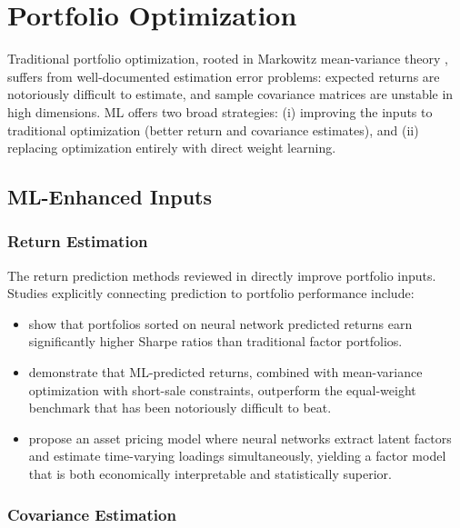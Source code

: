 \section{Portfolio Optimization}\label{sec:portfolio_optimization}

Traditional portfolio optimization, rooted in Markowitz mean-variance theory \citep{Markowitz1952}, suffers from well-documented estimation error problems: expected returns are notoriously difficult to estimate, and sample covariance matrices are unstable in high dimensions. ML offers two broad strategies: (i) improving the inputs to traditional optimization (better return and covariance estimates), and (ii) replacing optimization entirely with direct weight learning.

\subsection{ML-Enhanced Inputs}

\subsubsection{Return Estimation}

The return prediction methods reviewed in  directly improve portfolio inputs. Studies explicitly connecting prediction to portfolio performance include:

\begin{itemize}[leftmargin=*]
    \item \citet{Gu2020} show that portfolios sorted on neural network predicted returns earn significantly higher Sharpe ratios than traditional factor portfolios.
    \item \citet{DeMiguel2020} demonstrate that ML-predicted returns, combined with mean-variance optimization with short-sale constraints, outperform the equal-weight benchmark that has been notoriously difficult to beat.
    \item \citet{Cong2021} propose an asset pricing model where neural networks extract latent factors and estimate time-varying loadings simultaneously, yielding a factor model that is both economically interpretable and statistically superior.
\end{itemize}

\subsubsection{Covariance Estimation}

